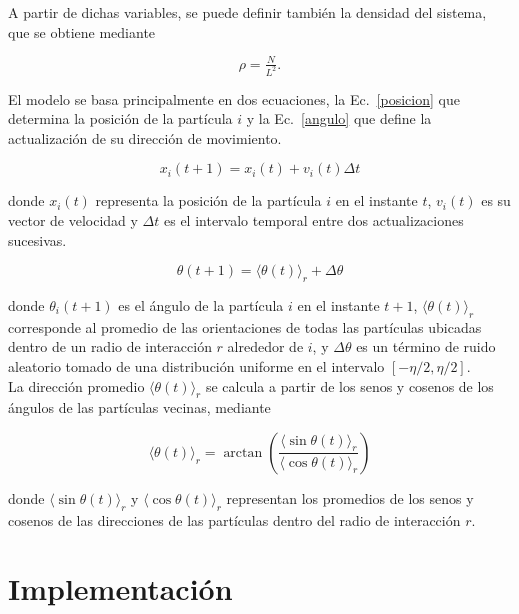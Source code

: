 \documentclass[12pt,a4paper]{article}
\begin{document}
A partir de dichas variables, se puede definir también la densidad del sistema, que se obtiene mediante

\begin{equation}
    \label{densidad}
    \rho = \tfrac{N}{L^2}.
\end{equation}

El modelo se basa principalmente en dos ecuaciones, la Ec.~\eqref{posicion} que determina la posición de la partícula $i$ y la Ec.~\eqref{angulo} que define la actualización de su dirección de movimiento.

\begin{equation}
    \label{posicion}
    x_i(t+1) = x_i(t) + v_i(t) \Delta t
\end{equation}

donde $x_i(t)$ representa la posición de la partícula $i$ en el instante $t$, $v_i(t)$ es su vector de velocidad y $\Delta t$ es el intervalo temporal entre dos actualizaciones sucesivas.

\begin{equation}
    \label{angulo}
    \theta(t+1) = \langle \theta(t) \rangle_r+ \Delta \theta
\end{equation}

donde $\theta_i(t+1)$ es el ángulo de la partícula $i$ en el instante $t+1$, $\langle \theta(t) \rangle_r$ corresponde al promedio de las orientaciones de todas las partículas ubicadas dentro de un radio de interacción $r$ alrededor de $i$, y $\Delta \theta$ es un término de ruido aleatorio tomado de una distribución uniforme en el intervalo $[-\eta/2, \eta/2]$.\\

La dirección promedio $\langle \theta(t) \rangle_r$ se calcula a partir de los senos y cosenos de los ángulos de las partículas vecinas, mediante

\begin{equation}
    \label{mean_angle}
    \langle \theta(t) \rangle_r = \arctan \left( \frac{\langle \sin \theta(t) \rangle_r}{\langle \cos \theta(t) \rangle_r} \right)
\end{equation}

donde $\langle \sin \theta(t) \rangle_r$ y $\langle \cos \theta(t) \rangle_r$ representan los promedios de los senos y cosenos de las direcciones de las partículas dentro del radio de interacción $r$. 

\section{Implementación}
\end{document}
